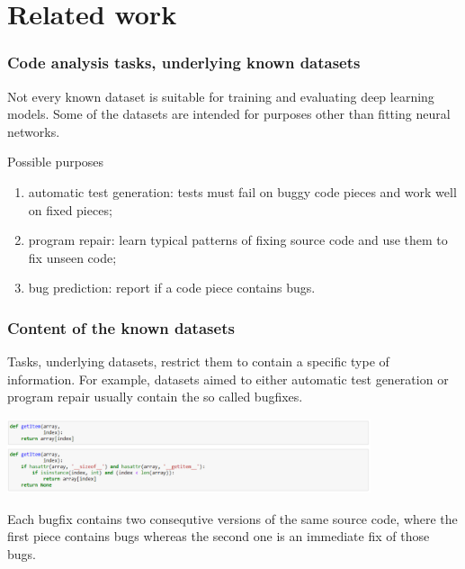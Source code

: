 \documentclass{beamer}
\begin{document}
\section{Related work}


\begin{frame}
\frametitle{Code analysis tasks, underlying known datasets}

Not every known dataset is suitable for training and evaluating deep learning models. Some of the datasets are intended for 
purposes other than fitting neural networks.

\begin{block}{Possible purposes}
\begin{enumerate}
\item automatic test generation: tests must fail on buggy code pieces and work well on fixed pieces;
\item program repair: learn typical patterns of fixing source code and use them to fix unseen code;
\item bug prediction: report if a code piece contains bugs.
\end{enumerate}
\end{block}

\end{frame}

\begin{frame}
\frametitle{Content of the known datasets}

Tasks, underlying datasets, restrict them to contain a specific type of information.
For example, datasets aimed to either automatic test generation or program repair usually contain the so called bugfixes. 

\begin{center}
\vspace{-0.2cm}
\includegraphics[height=2.2cm, width=10.7cm]{bugfix.pdf}
\end{center}

Each bugfix contains two consequtive versions of the same source code,
where the first piece contains bugs whereas the second one is an immediate fix of those bugs.

\end{frame}
\end{document}
